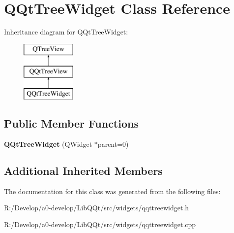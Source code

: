 \hypertarget{class_q_qt_tree_widget}{}\section{Q\+Qt\+Tree\+Widget Class Reference}
\label{class_q_qt_tree_widget}
Inheritance diagram for Q\+Qt\+Tree\+Widget\+:\begin{figure}[H]
\begin{center}
\leavevmode
\includegraphics[height=3.000000cm]{class_q_qt_tree_widget}
\end{center}
\end{figure}
\subsection*{Public Member Functions}
\begin{DoxyCompactItemize}
\item 
\mbox{\label{class_q_qt_tree_widget_a53bafb47d36de3f66025f8b56bd4ae50}} 
{\bfseries Q\+Qt\+Tree\+Widget} (Q\+Widget $\ast$parent=0)
\end{DoxyCompactItemize}
\subsection*{Additional Inherited Members}


The documentation for this class was generated from the following files\+:\begin{DoxyCompactItemize}
\item 
R\+:/\+Develop/a0-\/develop/\+Lib\+Q\+Qt/src/widgets/qqttreewidget.\+h\item 
R\+:/\+Develop/a0-\/develop/\+Lib\+Q\+Qt/src/widgets/qqttreewidget.\+cpp\end{DoxyCompactItemize}
